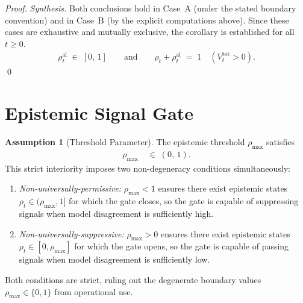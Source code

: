 \documentclass[12pt,openany]{book}
\numberwithin{equation}{chapter}
\theoremstyle{plain}
\theoremstyle{definition}
\newtheorem{assumption}[theorem]{Assumption}
\theoremstyle{remark}
\numberwithin{equation}{chapter}
\theoremstyle{plain}
\begin{document}
\begin{proof}
\medskip
\noindent\emph{Synthesis.}
Both conclusions hold in Case~A (under the stated boundary convention)
and in Case~B (by the explicit computations above).  Since these cases
are exhaustive and mutually exclusive, the corollary is established
for all $t \geq 0$.
\begin{align}
  \rho^{\mathrm{al}}_t \;\in\; [0,\,1]
  \qquad\text{and}\qquad
  \rho_t + \rho^{\mathrm{al}}_t \;=\; 1
  \quad (V^{\mathrm{tot}}_t > 0).
  \label{eq:frac-sum}
\end{align}
\qed
\end{proof}

\section{Epistemic Signal Gate}

\begin{assumption}[Threshold Parameter]
\label{asm:threshold}
The epistemic threshold $\rho_{\max}$ satisfies
\begin{align}
  \rho_{\max} &\;\in\; (0,\,1).
  \label{eq:threshold-range}
\end{align}
This strict interiority imposes two non-degeneracy conditions
simultaneously:
\begin{enumerate}
  \item \emph{Non-universally-permissive:} $\rho_{\max} < 1$ ensures
        there exist epistemic states $\rho_t \in (\rho_{\max}, 1]$
        for which the gate closes, so the gate is capable of
        suppressing signals when model disagreement is sufficiently
        high.
  \item \emph{Non-universally-suppressive:} $\rho_{\max} > 0$ ensures
        there exist epistemic states $\rho_t \in [0, \rho_{\max}]$
        for which the gate opens, so the gate is capable of passing
        signals when model disagreement is sufficiently low.
\end{enumerate}
Both conditions are strict, ruling out the degenerate boundary
values $\rho_{\max} \in \{0, 1\}$ from operational use.
\end{assumption}
\end{document}
